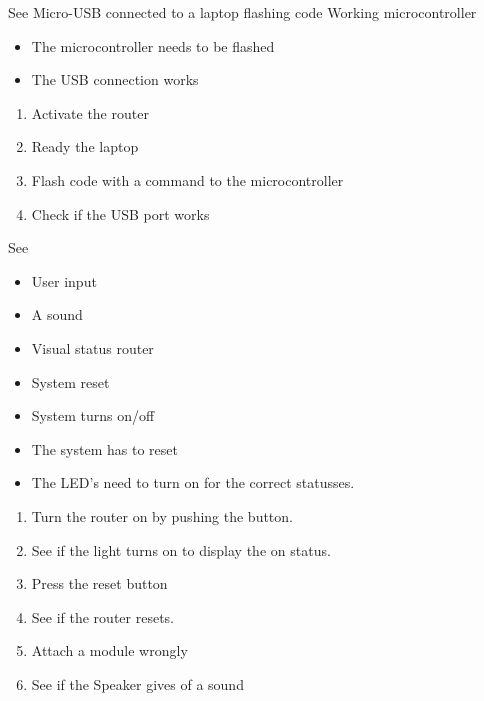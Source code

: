 {See }
{Micro-USB connected to a laptop flashing code}
{Working microcontroller}
{\begin{itemize}
    \item The microcontroller needs to be flashed
    \item The USB connection works
\end{itemize}}
{\begin{enumerate}
    \item Activate the router
    \item Ready the laptop
    \item Flash code with a command to the microcontroller
    \item Check if the USB port works
\end{enumerate}}

{See }
{\begin{itemize}
    \item User input
\end{itemize}}
{\begin{itemize}
    \item A sound
    \item Visual status router
    \item System reset
    \item System turns on/off
\end{itemize}}
{\begin{itemize}
    \item The system has to reset
    \item The LED's need to turn on for the correct statusses.
\end{itemize}}
{\begin{enumerate}
    \item Turn the router on by pushing the button.
    \item See if the light turns on to display the on status.
    \item Press the reset button
    \item See if the router resets.
    \item Attach a module wrongly
    \item See if the Speaker gives of a sound
\end{enumerate}}

